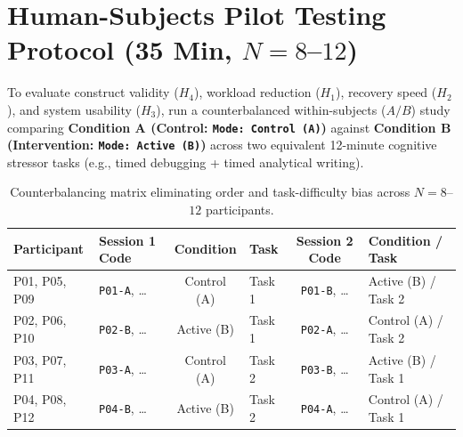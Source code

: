 \documentclass[11pt,a4paper]{article}
\newcommand{\uictrl}[1]{\texttt{\textbf{#1}}}
\begin{document}
\section{Human-Subjects Pilot Testing Protocol (35 Min, \texorpdfstring{$N = 8$--$12$}{N = 8--12})}

To evaluate construct validity ($H_4$), workload reduction ($H_1$), recovery speed ($H_2$), and system usability ($H_3$), run a counterbalanced within-subjects ($A/B$) study comparing \textbf{Condition A (Control: \uictrl{Mode: Control (A)})} against \textbf{Condition B (Intervention: \uictrl{Mode: Active (B)})} across two equivalent 12-minute cognitive stressor tasks (e.g., timed debugging + timed analytical writing).

\begin{table}[htbp]
\centering
\small
\begin{tabularx}{\textwidth}{l l c l c >{\raggedright\arraybackslash}X}
\toprule
\textbf{Participant} & \textbf{Session 1 Code} & \textbf{Condition} & \textbf{Task} & \textbf{Session 2 Code} & \textbf{Condition / Task} \\
\midrule
P01, P05, P09 & \texttt{P01-A}, \dots & Control (A) & Task 1 & \texttt{P01-B}, \dots & Active (B) / Task 2 \\
P02, P06, P10 & \texttt{P02-B}, \dots & Active (B) & Task 1 & \texttt{P02-A}, \dots & Control (A) / Task 2 \\
P03, P07, P11 & \texttt{P03-A}, \dots & Control (A) & Task 2 & \texttt{P03-B}, \dots & Active (B) / Task 1 \\
P04, P08, P12 & \texttt{P04-B}, \dots & Active (B) & Task 2 & \texttt{P04-A}, \dots & Control (A) / Task 1 \\
\bottomrule
\end{tabularx}
\caption{Counterbalancing matrix eliminating order and task-difficulty bias across $N=8$--$12$ participants.}
\label{tab:counterbalance}
\end{table}
\end{document}

